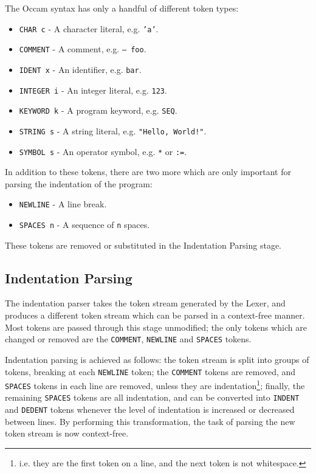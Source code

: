 The Occam syntax has only a handful of different token types:
\begin{itemize}
  \item \texttt{CHAR c} - A character literal, e.g. \texttt{'a'}.
  \item \texttt{COMMENT} - A comment, e.g. \texttt{-- foo}.
  \item \texttt{IDENT x} - An identifier, e.g. \texttt{bar}.
  \item \texttt{INTEGER i} - An integer literal, e.g. \texttt{123}.
  \item \texttt{KEYWORD k} - A program keyword, e.g. \texttt{SEQ}.
  \item \texttt{STRING s} - A string literal, e.g. \texttt{"Hello, World!"}.
  \item \texttt{SYMBOL s} - An operator symbol, e.g. \texttt{*} or \texttt{:=}.
\end{itemize}
In addition to these tokens, there are two more which are only important for
parsing the indentation of the program:
\begin{itemize}
  \item \texttt{NEWLINE} - A line break.
  \item \texttt{SPACES n} - A sequence of \texttt{n} spaces.
\end{itemize}
These tokens are removed or substituted in the Indentation Parsing stage.

\subsection{Indentation Parsing}

The indentation parser takes the token stream generated by the Lexer, and
produces a different token stream which can be parsed in a context-free manner.
Most tokens are passed through this stage unmodified; the only tokens which are
changed or removed are the \texttt{COMMENT}, \texttt{NEWLINE} and
\texttt{SPACES} tokens.

Indentation parsing is achieved as follows: the token stream is split into
groups of tokens, breaking at each \texttt{NEWLINE} token; the \texttt{COMMENT}
tokens are removed, and \texttt{SPACES} tokens in each line are removed, unless
they are indentation\footnote{i.e. they are the first token on a line, and the
next token is not whitespace.}; finally, the remaining \texttt{SPACES} tokens
are all indentation, and can be converted into \texttt{INDENT} and
\texttt{DEDENT} tokens whenever the level of indentation is increased or
decreased between lines. By performing this transformation, the task of parsing
the new token stream is now context-free.

